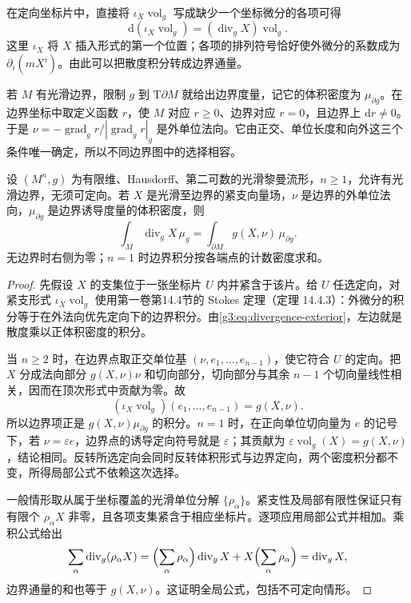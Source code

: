 在定向坐标片中，直接将 \(\iota_X\operatorname{vol}_g\) 写成缺少一个坐标微分的各项可得
\begin{equation}
	\label{g3:eq:divergence-exterior}
	\mathrm{d}(\iota_X\operatorname{vol}_g)
	=(\operatorname{div}_gX)\operatorname{vol}_g.
\end{equation}
这里 \(\iota_X\) 将 \(X\) 插入形式的第一个位置；各项的排列符号恰好使外微分的系数成为 \(\partial_i(mX^i)\)。由此可以把散度积分转成边界通量。

\ProseParagraphBreak

若 \(M\) 有光滑边界，限制 \(g\) 到 \(\mathrm{T}\partial M\) 就给出边界度量，记它的体积密度为 \(\mu_{\partial g}\)。在边界坐标中取定义函数 \(r\)，使 \(M\) 对应 \(r\geq0\)、边界对应 \(r=0\)，且边界上 \(\mathrm{d}r\ne0\)。于是 \(\nu=-\operatorname{grad}_g r/|\operatorname{grad}_g r|_g\) 是外单位法向。它由正交、单位长度和向外这三个条件唯一确定，所以不同边界图中的选择相容。

\begin{theorem}[散度定理]
	\label{g3:thm:divergence-theorem}
	设 \((M^n,g)\) 为有限维、Hausdorff、第二可数的光滑黎曼流形，\(n\geq1\)，允许有光滑边界，无须可定向。若 \(X\) 是光滑至边界的紧支向量场，\(\nu\) 是边界的外单位法向，\(\mu_{\partial g}\) 是边界诱导度量的体积密度，则
	\begin{equation}
		\label{g3:eq:divergence-theorem}
		\int_M\operatorname{div}_gX\,\mu_g
		=\int_{\partial M}g(X,\nu)\,\mu_{\partial g}.
	\end{equation}
	无边界时右侧为零；\(n=1\) 时边界积分按各端点的计数密度求和。
\end{theorem}
\begin{proof}
	先假设 \(X\) 的支集位于一张坐标片 \(U\) 内并紧含于该片。给 \(U\) 任选定向，对紧支形式 \(\iota_X\operatorname{vol}_g\) 使用第一卷第14.4节的 Stokes 定理（定理 14.4.3）：外微分的积分等于在外法向优先定向下的边界积分。由\eqref{g3:eq:divergence-exterior}，左边就是散度乘以正体积密度的积分。

	当 \(n\geq2\) 时，在边界点取正交单位基 \((\nu,e_1,\ldots,e_{n-1})\)，使它符合 \(U\) 的定向。把 \(X\) 分成法向部分 \(g(X,\nu)\nu\) 和切向部分，切向部分与其余 \(n-1\) 个切向量线性相关，因而在顶次形式中贡献为零。故
	\[
		(\iota_X\operatorname{vol}_g)(e_1,\ldots,e_{n-1})=g(X,\nu).
	\]
	所以边界项正是 \(g(X,\nu)\mu_{\partial g}\) 的积分。\(n=1\) 时，在正向单位切向量为 \(e\) 的记号下，若 \(\nu=\varepsilon e\)，边界点的诱导定向符号就是 \(\varepsilon\)；其贡献为 \(\varepsilon\operatorname{vol}_g(X)=g(X,\nu)\)，结论相同。反转所选定向会同时反转体积形式与边界定向，两个密度积分都不变，所得局部公式不依赖这次选择。

	一般情形取从属于坐标覆盖的光滑单位分解 \(\{\rho_\alpha\}\)。紧支性及局部有限性保证只有有限个 \(\rho_\alpha X\) 非零，且各项支集紧含于相应坐标片。逐项应用局部公式并相加。乘积公式给出
	\[
		\sum_\alpha\operatorname{div}_g(\rho_\alpha X)
		=\Bigl(\sum_\alpha\rho_\alpha\Bigr)\operatorname{div}_gX
		+X\Bigl(\sum_\alpha\rho_\alpha\Bigr)
		=\operatorname{div}_gX,
	\]
	边界通量的和也等于 \(g(X,\nu)\)。这证明全局公式，包括不可定向情形。
\end{proof}

